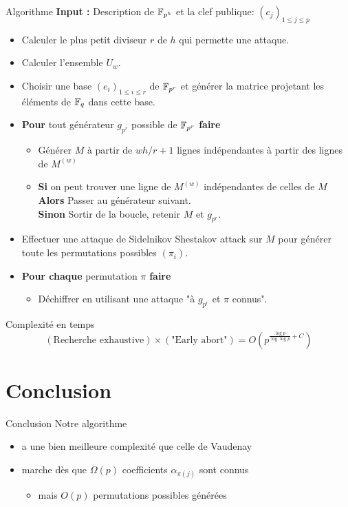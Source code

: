 \documentclass[]{beamer}
\begin{document}
\begin{frame}{Algorithme}
\textbf{Input : } Description de $\mathbb{F}_{p^h}$ et la clef publique: $(c_j)_{1 \leq j \leq p}$
\begin{itemize}
\item Calculer le plus petit diviseur $r$ de $h$ qui permette une attaque.

\item Calculer l'ensemble $U_w$.
\item Choisir une base $(e_i)_{1 \leq i \leq r}$ de $\mathbb{F}_{p^r}$ et générer la matrice projetant les éléments de $\mathbb{F}_q$ dans cette base.

\item \textbf{Pour} tout générateur $g_{p^r}$ possible de $\mathbb{F}_{p^r}$ \textbf{faire}
\begin{itemize}
\item Générer $M$ à partir de $wh/r+1$ lignes indépendantes à partir des lignes de $M^{(w)}$

\item \textbf{Si } on peut trouver une ligne de $M^{(w)}$ indépendantes de celles de $M$\\
\textbf{Alors } Passer au générateur suivant. \\
\textbf{Sinon } Sortir de la boucle, retenir $M$ et $g_{p^r}$.
\end{itemize}
\item Effectuer une attaque de Sidelnikov Shestakov attack sur $M$ pour générer toute les permutations possibles $(\pi_i)$.
\item \textbf{Pour chaque } permutation $\pi$ \textbf{ faire }
\begin{itemize}
\item Déchiffrer en utilisant une attaque "à $g_{p^r}$ et $\pi$ connus".
\end{itemize}
\end{itemize}
\end{frame}


\begin{frame}{Complexité en temps}
$$ (\text{Recherche exhaustive}) \times (\text{"Early abort"}) = O\left( p^{\frac{\log p}{\log \log p} + C} \right) $$
\end{frame}


\section{Conclusion}

\begin{frame}{Conclusion}
Notre algorithme
\begin{itemize}
\item a une bien meilleure complexité que celle de Vaudenay
\item marche dès que $\Omega(p)$ coefficients $\alpha_{\pi(j)}$ sont connus
\begin{itemize}
\item mais $O(p)$ permutations possibles générées
\end{itemize}
\end{itemize}
\end{frame}
\end{document}
